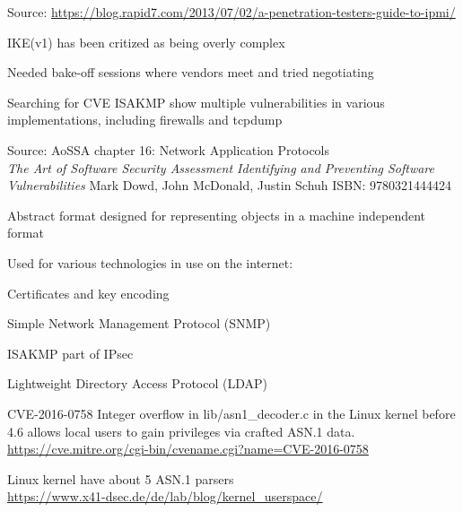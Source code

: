 \documentclass[Screen16to9,17pt]{foils}
\begin{document}
Source: \url{https://blog.rapid7.com/2013/07/02/a-penetration-testers-guide-to-ipmi/}


\begin{list2}
\item IKE(v1) has been critized as being overly complex
\item Needed bake-off sessions where vendors meet and tried negotiating
\item Searching for CVE ISAKMP show multiple vulnerabilities in various implementations, including firewalls and tcpdump
\item Source: AoSSA chapter 16: Network Application Protocols\\
\emph{The Art of Software Security Assessment Identifying and Preventing
Software Vulnerabilities}
Mark Dowd, John McDonald, Justin Schuh ISBN: 9780321444424
\end{list2}




\begin{list2}
\item Abstract format designed for representing objects in a machine independent format
\item Used for various technologies in use on the internet:
\item Certificates and key encoding
\item Simple Network Management Protocol (SNMP)
\item ISAKMP part of IPsec
\item Lightweight Directory Access Protocol (LDAP)
\end{list2}


\begin{list2}
\item CVE-2016-0758 Integer overflow in lib/asn1\_decoder.c in the Linux kernel before 4.6 allows local users to gain privileges via crafted ASN.1 data.\\
\url{https://cve.mitre.org/cgi-bin/cvename.cgi?name=CVE-2016-0758}
\item Linux kernel have about 5 ASN.1 parsers\\
\url{https://www.x41-dsec.de/de/lab/blog/kernel_userspace/}
\end{list2}



\end{document}
